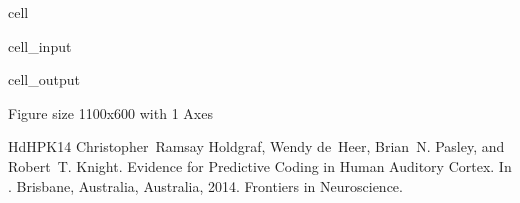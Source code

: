 \documentclass[letterpaper,10pt,english]{jupyterBook}
\begin{document}
\begin{sphinxuseclass}{cell}\begin{sphinxVerbatimInput}

\begin{sphinxuseclass}{cell_input}
\begin{sphinxVerbatim}[commandchars=\\\{\}]
\end{sphinxVerbatim}

\end{sphinxuseclass}\end{sphinxVerbatimInput}
\begin{sphinxVerbatimOutput}

\begin{sphinxuseclass}{cell_output}
\begin{sphinxVerbatim}[commandchars=\\\{\}]
\PYGZlt{}Figure size 1100x600 with 1 Axes\PYGZgt{}
\end{sphinxVerbatim}

\end{sphinxuseclass}\end{sphinxVerbatimOutput}

\end{sphinxuseclass}
\begin{sphinxthebibliography}{HdHPK14}
\sphinxAtStartPar
Christopher Ramsay Holdgraf, Wendy de Heer, Brian N. Pasley, and Robert T. Knight. Evidence for Predictive Coding in Human Auditory Cortex. In . Brisbane, Australia, Australia, 2014. Frontiers in Neuroscience.
\end{sphinxthebibliography}







\renewcommand{\indexname}{Index}
\printindex
\end{document}
